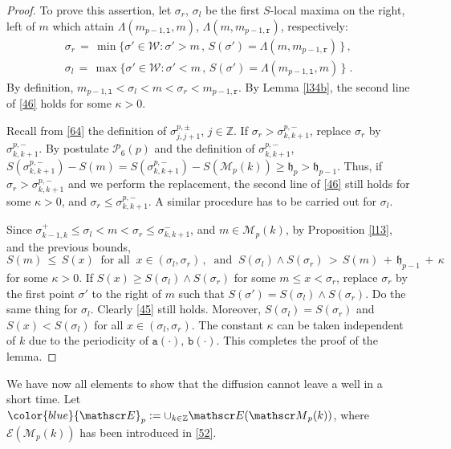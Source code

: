 \documentclass[reqno]{amsart}
\theoremstyle{plain}
\theoremstyle{definition}
\newcommand{\mc}[1]{{\mathcal #1}}
\newcommand{\mf}[1]{{\mathfrak #1}}
\newcommand{\bb}[1]{{\mathbb #1}}
\newcommand{\ms}[1]{{\mathscr #1}}
\newcommand{\mtt}[1]{{\mathtt #1}}
\newcounter{as}[section]
\newcommand{\<}{\langle}
\renewcommand{\>}{\rangle}
\begin{document}
\begin{proof}
To prove this assertion, let $\sigma_r$, $\sigma_l$ be the first
$S$-local maxima on the right, left of $m$ which attain
$\Lambda (m_{p-1, \mtt l} , m)$, $\Lambda (m, m_{p-1, \mtt r})$,
respectively:
\begin{gather*}
\sigma_r \,=\, \min\big\{\sigma' \in \mc W :
\sigma' > m \,,\, S(\sigma') = \Lambda (m, m_{p-1, \mtt r})\, 
\big\}\,,
\\
\sigma_l \,=\, \max \big\{ \sigma' \in \mc W :
\sigma' < m \,,\, S(\sigma') = \Lambda (m_{p-1, \mtt l},m)\, 
\big \} \;.
\end{gather*}
By definition,
$m_{p-1, \mtt l} < \sigma_l < m < \sigma_r < m_{p-1, \mtt r}$.  By
Lemma \ref{l34b}, the second line of \eqref{46} holds for some
$\kappa>0$.

Recall from \eqref{64} the definition of $\sigma_{j,j+1}^{p,\pm}$,
$j\in\bb Z$. If $\sigma_r> \sigma_{k,k+1}^{p,-}$, replace $\sigma_r$
by $\sigma_{k,k+1}^{p,-}$. By postulate $\mc P_6(p)$ and the
definition of $\sigma_{k,k+1}^{p,-}$,
$S(\sigma_{k,k+1}^{p,-}) - S(m) = S(\sigma_{k,k+1}^{p,-}) - S(\ms
M_p(k)) \ge \mf h_p > \mf h_{p-1}$. Thus, if
$\sigma_r> \sigma_{k,k+1}^{p,-}$ and we perform the replacement, the
second line of \eqref{46} still holds for some $\kappa>0$, and
$\sigma_r \le \sigma_{k,k+1}^{p,-}$. A similar procedure has to be
carried out for $\sigma_l$.

Since
$\sigma_{k-1,k}^+ \le \sigma_l < m < \sigma_r \le \sigma_{k,k+1}^-$,
and $m\in\ms M_p(k)$, by Proposition \ref{l13}, and the previous
bounds,
\begin{equation}
\label{45}
S(m) \,\le\, S(x)\;\; \text{for all}
\;\; x\in (\sigma_l,\sigma_r)\,, \;\;
\text{and}\;\; 
S(\sigma_l) \wedge S(\sigma_r)
\,>\, S(m) \,+\, \mf h_{p-1} \,+\, \kappa
\end{equation}
for some $\kappa>0$. If $S(x) \ge S(\sigma_l)\wedge S(\sigma_r)$ for
some $m\le x< \sigma_r$, replace $\sigma_r$ by the first point
$\sigma'$ to the right of $m$ such that
$S(\sigma') = S(\sigma_l)\wedge S(\sigma_r)$. Do the same thing for
$\sigma_l$. Clearly \eqref{45} still holds. Moreover,
$S(\sigma_l) = S(\sigma_r)$ and $S(x) < S(\sigma_l)$ for all
$x\in (\sigma_l,\sigma_r)$. The constant $\kappa$ can be taken
independent of $k$ due to the periodicity of $\mtt a(\cdot)$,
$\mtt b(\cdot)$. This completes the proof of the lemma.
\end{proof}

We have now all elements to show that the diffusion cannot leave a
well in a short time.  Let
${\color{blue} \ms E_p} := \cup_{k\in\bb Z} \ms E(\ms M_p(k))$, where
$\ms E (\ms M_p(k))$ has been introduced in \eqref{52}.
\end{document}
